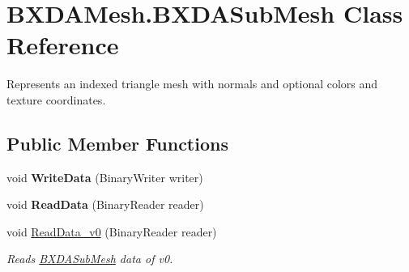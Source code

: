\hypertarget{class_b_x_d_a_mesh_1_1_b_x_d_a_sub_mesh}{}\section{B\+X\+D\+A\+Mesh.\+B\+X\+D\+A\+Sub\+Mesh Class Reference}
\label{class_b_x_d_a_mesh_1_1_b_x_d_a_sub_mesh}


Represents an indexed triangle mesh with normals and optional colors and texture coordinates.  


\subsection*{Public Member Functions}
\begin{DoxyCompactItemize}
\item 
\mbox{\label{class_b_x_d_a_mesh_1_1_b_x_d_a_sub_mesh_a8032ed099154adc3a1b9eb533858f514}} 
void {\bfseries Write\+Data} (Binary\+Writer writer)
\item 
\mbox{\label{class_b_x_d_a_mesh_1_1_b_x_d_a_sub_mesh_a4fb22656afc7f6f6ca71b08b7b9f3b20}} 
void {\bfseries Read\+Data} (Binary\+Reader reader)
\item 
void \hyperlink{class_b_x_d_a_mesh_1_1_b_x_d_a_sub_mesh_a3f50b41f51136f7662730d2037875c11}{Read\+Data\+\_\+v0} (Binary\+Reader reader)
\begin{DoxyCompactList}\small\item\em Reads \hyperlink{class_b_x_d_a_mesh_1_1_b_x_d_a_sub_mesh}{B\+X\+D\+A\+Sub\+Mesh} data of v0. \end{DoxyCompactList}\end{DoxyCompactItemize}

